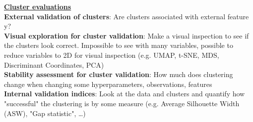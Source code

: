\documentclass[a4paper,7pt,landscape]{extarticle}
\begin{document}
\begin{multicols}{3}
\begin{boxA}
\underline{\textbf{Cluster evaluations}}\\
\textbf{External validation of clusters}: Are clusters associated with external feature y?\\
\textbf{Visual exploration for cluster validation}: Make a visual inspection to see if the clusters look correct. Impossible to see with many variables, possible to reduce variables to 2D for visual inspection (e.g. UMAP, t-SNE, MDS, Discriminant Coordinates, PCA)\\
\textbf{Stability assessment for cluster validation}: How much does clustering change when changing some hyperparameters, observations, features\\
\textbf{Internal validation indices}: Look at the data and clusters and quantify how "successful" the clustering is by some measure (e.g. Average Silhouette Width (ASW), "Gap statistic", …)
\end{boxA}


\end{multicols}
\end{document}

